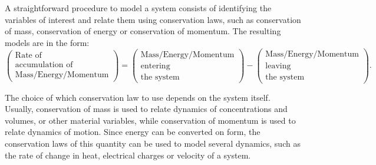 \documentclass[a4paper,11pt]{book}
\numberwithin{figure}{chapter}
\numberwithin{equation}{chapter}
\numberwithin{table}{chapter}
\theoremstyle{definition}
\begin{document}
A straightforward procedure to model a system consists of identifying the variables of interest and relate them using conservation laws, such as conservation of mass, conservation of energy or conservation of momentum. The resulting models are in the form:
\begin{equation} \label{eq:massCons01}
    \begin{pmatrix}
        \text{Rate of} \\ \text{accumulation of} \\ \text{Mass/Energy/Momentum}  
    \end{pmatrix} = \begin{pmatrix}
        \text{Mass/Energy/Momentum} \\ \text{entering} \\ \text{the system}
    \end{pmatrix} - \begin{pmatrix}
        \text{Mass/Energy/Momentum} \\ \text{leaving} \\ \text{the system}
    \end{pmatrix}
.\end{equation}

The choice of which conservation law to use depends on the system itself. Usually, conservation of mass is used to relate dynamics of concentrations and volumes, or other material variables, while conservation of momentum is used to relate dynamics of motion. Since energy can be converted on form, the conservation laws of this quantity can be used to model several dynamics, such as the rate of change in heat, electrical charges or velocity of a system.
\end{document}
